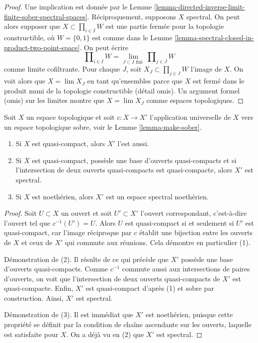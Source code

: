 \begin{proof}
Une implication est donnée par le
Lemme \ref{lemma-directed-inverse-limit-finite-sober-spectral-spaces}.
Réciproquement, supposons $X$ spectral. On peut alors supposer que
$X \subset \prod_{i \in I} W$ est une partie fermée pour la topologie
constructible, où $W = \{0, 1\}$ est comme dans le
Lemme \ref{lemma-spectral-closed-in-product-two-point-space}.
On peut écrire
$$
\prod\nolimits_{i \in I} W =
\lim_{J \subset I\text{ fini }} \prod\nolimits_{j \in J} W
$$
comme limite cofiltrante.
Pour chaque $J$, soit $X_J \subset \prod_{j \in J} W$ l'image de $X$.
On voit alors que $X = \lim X_J$ en tant qu'ensembles parce que $X$ est fermé
dans le produit muni de la topologie constructible (détail omis).
Un argument formel (omis) sur les limites montre que $X = \lim X_J$ comme
espaces topologiques.
\end{proof}

\begin{lemma}
\label{lemma-Noetherian-goes-to-spectral}
Soit $X$ un espace topologique et soit $c : X \to X'$ l'application universelle
de $X$ vers un espace topologique sobre, voir le
Lemme \ref{lemma-make-sober}.
\begin{enumerate}
\item Si $X$ est quasi-compact, alors $X'$ l'est aussi.
\item Si $X$ est quasi-compact, possède une base d'ouverts quasi-compacts et si
l'intersection de deux ouverts quasi-compacts est quasi-compacte, alors $X'$ est
spectral.
\item Si $X$ est noethérien, alors $X'$ est un espace spectral noethérien.
\end{enumerate}
\end{lemma}

\begin{proof}
Soit $U \subset X$ un ouvert et soit $U' \subset X'$ l'ouvert correspondant,
c'est-à-dire l'ouvert tel que $c^{-1}(U') = U$.
Alors $U$ est quasi-compact si et seulement si $U'$ est quasi-compact, car
l'image réciproque par $c$ établit une bijection entre les ouverts de $X$ et
ceux de $X'$ qui commute aux réunions. Cela démontre en particulier (1).

\medskip\noindent
Démonstration de (2). Il résulte de ce qui précède que $X'$ possède une base
d'ouverts quasi-compacts. Comme $c^{-1}$ commute aussi aux intersections de
paires d'ouverts, on voit que l'intersection de deux ouverts quasi-compacts de
$X'$ est quasi-compacte. Enfin, $X'$ est quasi-compact d'après (1) et sobre par
construction. Ainsi, $X'$ est spectral.

\medskip\noindent
Démonstration de (3). Il est immédiat que $X'$ est noethérien, puisque cette
propriété se définit par la condition de chaîne ascendante sur les ouverts,
laquelle est satisfaite pour $X$. On a déjà vu en (2) que $X'$ est spectral.
\end{proof}

